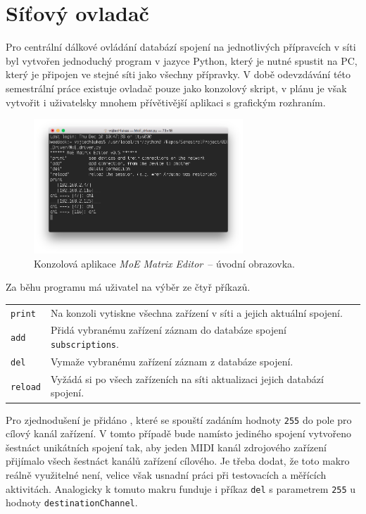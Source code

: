 \chapter{Síťový ovladač}\label{chpt:MatrixEditor}
Pro centrální dálkové ovládání databází spojení na jednotlivých přípravcích v síti byl vytvořen jednoduchý program v jazyce Python, který je nutné spustit na PC, který je připojen ve stejné síti jako všechny přípravky. V době odevzdávání této semestrální práce existuje ovladač pouze jako konzolový skript, v plánu je však vytvořit i uživatelsky mnohem přívětivější aplikaci s grafickým rozhraním.

\begin{figure}[h]
    \centering
    \includegraphics[width=0.7\textwidth]{obrazky/MoE_editor_1.png}
    \caption{Konzolová aplikace \emph{MoE Matrix Editor}~-- úvodní obrazovka.}
    \label{fig:Driver_1}
\end{figure}

Za běhu programu má uživatel na výběr ze čtyř příkazů.
\begin{table}[h]
    \centering
        \begin{tabular}{l p{}}
            \texttt{print} & Na konzoli vytiskne všechna zařízení v síti a jejich aktuální spojení. \\
            \texttt{add} & Přidá vybranému zařízení záznam do databáze spojení \texttt{subscriptions}. \\
            \texttt{del} & Vymaže vybranému zařízení záznam z databáze spojení. \\
            \texttt{reload} & Vyžádá si po všech zařízeních na síti aktualizaci jejich databází spojení. \\
        \end{tabular}
\end{table}



Pro zjednodušení je přidáno , které se spouští zadáním hodnoty \texttt{255} do pole pro cílový kanál zařízení. V tomto případě bude namísto jediného spojení vytvořeno šestnáct unikátních spojení tak, aby jeden \acs{MIDI} kanál zdrojového zařízení přijímalo všech šestnáct kanálů zařízení cílového. Je třeba dodat, že toto makro reálně využitelné není, velice však usnadní práci při testovacích a měřících aktivitách. Analogicky k tomuto makru funduje i příkaz \texttt{del} s parametrem \texttt{255} u hodnoty \texttt{destinationChannel}.

